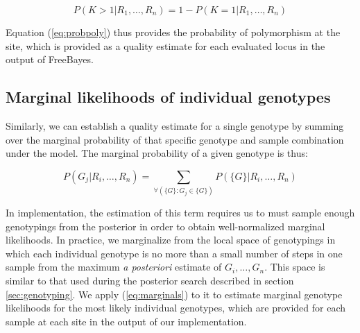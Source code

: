 \documentclass{article}
\begin{document}
\begin{equation}
\label{eq:probpoly}
P(K > 1 | R_1,\ldots,R_n)
=
1 - P(K = 1 | R_1,\ldots,R_n)
\end{equation}

Equation (\ref{eq:probpoly}) thus provides the probability of polymorphism at the site, which is provided as a quality estimate for each evaluated locus in the output of FreeBayes.

\subsection{Marginal likelihoods of individual genotypes}

Similarly, we can establish a quality estimate for a single genotype by summing over the marginal probability of that specific genotype and sample combination under the model.  The marginal probability of a given genotype is thus:

\begin{equation}
\label{eq:marginals}
P(G_j|R_i,\ldots,R_n)
=
\sum_{\forall(\{G\} : G_j \in \{G\})}
P(\{G\}|R_i,\ldots,R_n)
\end{equation}

In implementation, the estimation of this term requires us to must sample enough genotypings from the posterior in order to obtain well-normalized marginal likelihoods.  In practice, we marginalize from the local space of genotypings in which each individual genotype is no more than a small number of steps in one sample from the maximum \emph{a posteriori} estimate of $G_i,\ldots,G_n$.  This space is similar to that used during the posterior search described in section \ref{sec:genotyping}.  We apply (\ref{eq:marginals}) to it to estimate marginal genotype likelihoods for the most likely individual genotypes, which are provided for each sample at each site in the output of our implementation.





%


{}
%

\end{document}
